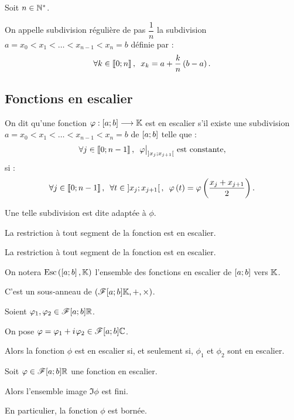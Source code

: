 \begin{defi}
Soit \(n\in\mathbb{N}^*\).

On appelle subdivision régulière de pas \(\dfrac{1}{n}\) la subdivision \(a=x_0<x_1<\dots<x_{n-1}<x_n=b\) définie par : \[\quantifs{\forall k\in\interventierii{0}{n}}x_k=a+\dfrac{k}{n}\paren{b-a}.\]
\end{defi}

\subsection{Fonctions en escalier}

\begin{defi}
On dit qu'une fonction \(\varphi:\left[a;b\right]\longrightarrow\mathbb{K}\) est en escalier s'il existe une subdivision \(a=x_0<x_1<\dots<x_{n-1}<x_n=b\) de \(\left[a;b\right]\) telle que : \[\quantifs{\forall j\in\interventierii{0}{n-1}}\restr{\phi}{\intervee{x_j}{x_{j+1}}}\text{ est constante},\] \cad si : \[\quantifs{\forall j\in\interventierii{0}{n-1};\forall t\in\intervee{x_j}{x_{j+1}}}\phi\paren{t}=\phi\paren{\dfrac{x_j+x_{j+1}}{2}}.\]

Une telle subdivision est dite adaptée à \(\phi\).
\end{defi}

\begin{ex}
La restriction à tout segment de la fonction  est en escalier.

La restriction à tout segment de la fonction  est en escalier.
\end{ex}

\begin{nota}
On notera \(\Esc\) l'ensemble des fonctions en escalier de \(\left[a;b\right]\) vers \(\mathbb{K}\).

C'est un sous-anneau de \(\anneau{\F{\intervii{a}{b}}{\K}}\).
\end{nota}

\begin{rem}
Soient \(\varphi_1,\varphi_2\in\mathscr{F}{\left[a;b\right]}{\mathbb{R}}\).

On pose \(\varphi=\varphi_1+i\mkern1mu\varphi_2\in\mathscr{F}{\left[a;b\right]}{\mathbb{C}}\).

Alors la fonction \(\phi\) est en escalier si, et seulement si, \(\phi_1\) et \(\phi_2\) sont en escalier.
\end{rem}

\begin{rem}
Soit \(\varphi\in\mathscr{F}{\left[a;b\right]}{\mathbb{R}}\) une fonction en escalier.

Alors l'ensemble image \(\Im\phi\) est fini.

En particulier, la fonction \(\phi\) est bornée.
\end{rem}

